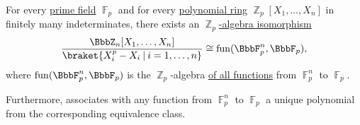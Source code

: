 \begin{proposition}\label{thm:functions_over_prime_fields}
  For every \hyperref[thm:prime_fields]{prime field} \hyperref[thm:ring_of_integers_modulo]{\( \BbbF_p \)} and for every \hyperref[def:polynomial_semiring]{polynomial ring} \( \BbbZ_p[X_1, \ldots, X_n] \) in finitely many indeterminates, there exists an \hyperref[def:algebra_over_ring]{\( \BbbZ_p \)-algebra isomorphism}
  \begin{equation*}
    \frac {\BbbZ_n[X_1, \ldots, X_n]} {\braket{ X_i^p - X_i \given i = 1, \ldots, n }} \cong \fun(\BbbF_p^n, \BbbF_p),
  \end{equation*}
  where \( \fun(\BbbF_p^n, \BbbF_p) \) is the \( \BbbZ_p \)-algebra \hyperref[thm:functions_over_semimodule]{of all functions} from \( \BbbF_p^n \) to \( \BbbF_p \).

  Furthermore,  associates with any function from \( \BbbF_p^n \) to \( \BbbF_p \) a unique polynomial from the corresponding equivalence class.
\end{proposition}
